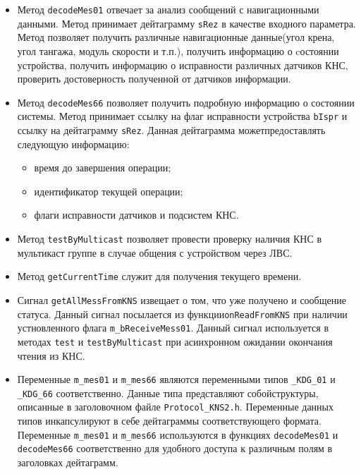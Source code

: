 \begin{itemize}
	\item Метод \texttt{decodeMes01} отвечает за анализ сообщений с навигационными данными. Метод принимает
		дейтаграмму \texttt{sRez} в качестве входного параметра. Метод позволяет получить
		различные навигационные данные(угол крена, угол тангажа, модуль скорости и т.п.), получить информацию о
		cостоянии устройства, получить информацию о исправности различных датчиков КНС, проверить достоверность
		полученной от датчиков информации.

	\item Метод \texttt{decodeMes66} позволяет получить подробную информацию о состоянии системы. Метод принимает
		ссылку на флаг исправности устройства \texttt{bIspr} и ссылку на дейтаграмму \texttt{sRez}. Данная
		дейтаграмма может\break предоставлять следующую информацию:
		\begin{itemize}
				\item время до завершения операции;
				\item идентификатор текущей операции;
				\item флаги исправности датчиков и подсистем КНС.
		\end{itemize}

	\item Метод \texttt{testByMulticast} позволяет провести проверку наличия КНС в мультикаст группе в случае
		общения с устройством через ЛВС.

	\item Метод \texttt{getCurrentTime} служит для получения текущего времени.

	\item Сигнал \texttt{getAllMessFromKNS} извещает о том, что уже получено и сообщение статуса. Данный сигнал
		посылается из функции\break \texttt{onReadFromKNS} при наличии
		устновленного флага
		\texttt{m\_bReceiveMess01}. Данный сигнал используется в методах
		\texttt{test} и \texttt{testByMulticast} при асинхронном ожидании окончания чтения из КНС.

	\item Переменные \texttt{m\_mes01} и \texttt{m\_mes66} являются переменными типов \texttt{\_KDG\_01} и
		\texttt{\_KDG\_66} соответственно. Данные типа представляют собой\break структуры, описанные в заголовочном
		файле \texttt{Protocol\_KNS2.h}. Переменные данных типов инкапсулируют в себе дейтаграммы
		соответствующего формата. Переменные \texttt{m\_mes01} и \texttt{m\_mes66} используются в функциях
		\break
		\texttt{decodeMes01} и \texttt{decodeMes66} соответственно для удобного доступа к различным полям в
		заголовках дейтаграмм.
\end{itemize}

